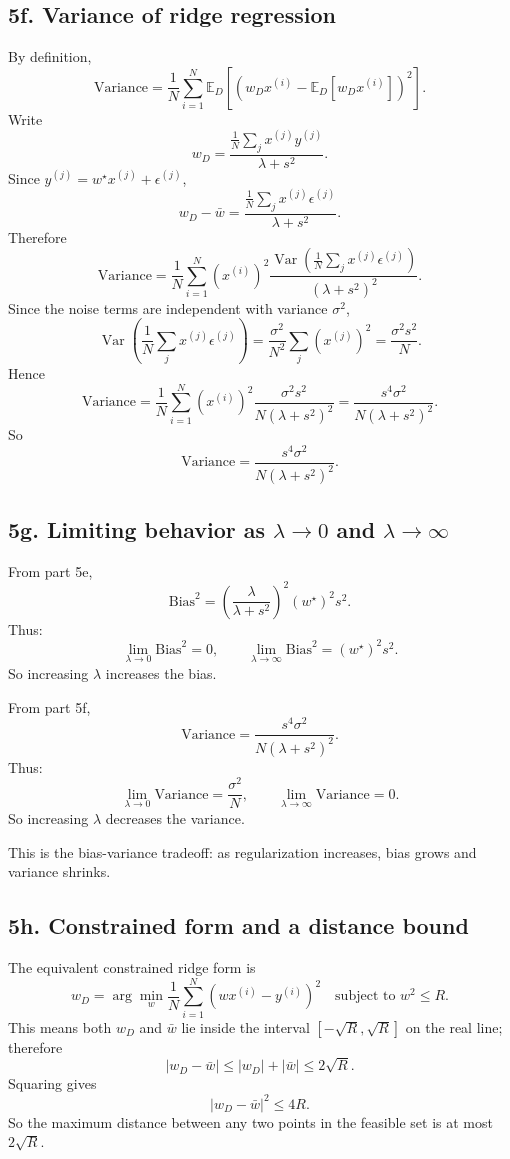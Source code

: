 \documentclass[11pt]{article}
\begin{document}
\subsection*{5f. Variance of ridge regression}

By definition,
\[
\text{Variance} = \frac1N\sum_{i=1}^N \mathbb{E}_D\left[(w_Dx^{(i)}-\mathbb{E}_D[w_Dx^{(i)}])^2\right].
\]
Write
\[
 w_D = \frac{\frac1N\sum_j x^{(j)}y^{(j)}}{\lambda+s^2}.
\]
Since $y^{(j)} = w^\star x^{(j)} + \epsilon^{(j)}$,
\[
 w_D - \bar w = \frac{\frac1N\sum_j x^{(j)}\epsilon^{(j)}}{\lambda+s^2}.
\]
Therefore
\[
\text{Variance} = \frac1N\sum_{i=1}^N (x^{(i)})^2\frac{\operatorname{Var}\left(\frac1N\sum_j x^{(j)}\epsilon^{(j)}\right)}{(\lambda+s^2)^2}.
\]
Since the noise terms are independent with variance $\sigma^2$,
\[
\operatorname{Var}\left(\frac1N\sum_j x^{(j)}\epsilon^{(j)}\right)=\frac{\sigma^2}{N^2}\sum_j (x^{(j)})^2 = \frac{\sigma^2 s^2}{N}.
\]
Hence
\[
\text{Variance} = \frac{1}{N}\sum_{i=1}^N (x^{(i)})^2 \frac{\sigma^2 s^2}{N(\lambda+s^2)^2}
= \frac{s^4\sigma^2}{N(\lambda+s^2)^2}.
\]
So
\[
\boxed{\text{Variance}=\frac{s^4\sigma^2}{N(\lambda+s^2)^2}.}
\]

\subsection*{5g. Limiting behavior as $\lambda\to 0$ and $\lambda\to\infty$}

From part 5e,
\[
\text{Bias}^2 = \left(\frac{\lambda}{\lambda+s^2}\right)^2 (w^\star)^2 s^2.
\]
Thus:
\[
\lim_{\lambda\to 0} \text{Bias}^2 = 0,
\qquad
\lim_{\lambda\to \infty} \text{Bias}^2 = (w^\star)^2s^2.
\]
So increasing $\lambda$ increases the bias.

From part 5f,
\[
\text{Variance}=\frac{s^4\sigma^2}{N(\lambda+s^2)^2}.
\]
Thus:
\[
\lim_{\lambda\to 0} \text{Variance}=\frac{\sigma^2}{N},
\qquad
\lim_{\lambda\to\infty} \text{Variance}=0.
\]
So increasing $\lambda$ decreases the variance.

This is the bias-variance tradeoff: as regularization increases, bias grows and variance shrinks.

\subsection*{5h. Constrained form and a distance bound}

The equivalent constrained ridge form is
\[
 w_D = \arg\min_w \frac1N\sum_{i=1}^N (wx^{(i)}-y^{(i)})^2
\quad\text{subject to } w^2\le R.
\]
This means both $w_D$ and $\bar w$ lie inside the interval $[-\sqrt R,\sqrt R]$ on the real line; therefore
\[
|w_D-\bar w| \le |w_D|+|\bar w| \le 2\sqrt R.
\]
Squaring gives
\[
|w_D-\bar w|^2 \le 4R.
\]
So the maximum distance between any two points in the feasible set is at most $2\sqrt R$.
\end{document}
